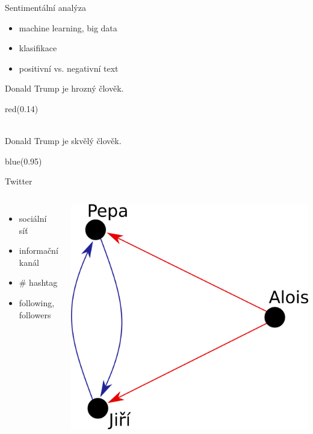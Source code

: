 \documentclass[notheorems,12pt]{beamer}
\begin{document}
\begin{frame}{Sentimentální analýza}
\begin{itemize}
    \item machine learning, big data
    \item klasifikace
    \item positivní vs. negativní text
\end{itemize}
\center
Donald Trump je hrozný člověk.\\
\begin{color}{red}(0.14)\end{color}\\
\vspace{0.5cm}
Donald Trump je skvělý člověk.\\
\begin{color}{blue}(0.95)\end{color}
\end{frame}
\begin{frame}{Twitter}
    \begin{columns}
    \column{5cm}
    	\begin{itemize}
    		\item sociální síť
    		\item informační kanál
    		\item \# hashtag
    		\item following, followers
    	\end{itemize}
    \column{6cm}
    	\center
    	\includegraphics[scale=0.35]{./Pics/pepa.png}
    \end{columns}
\end{frame}
\end{document}
